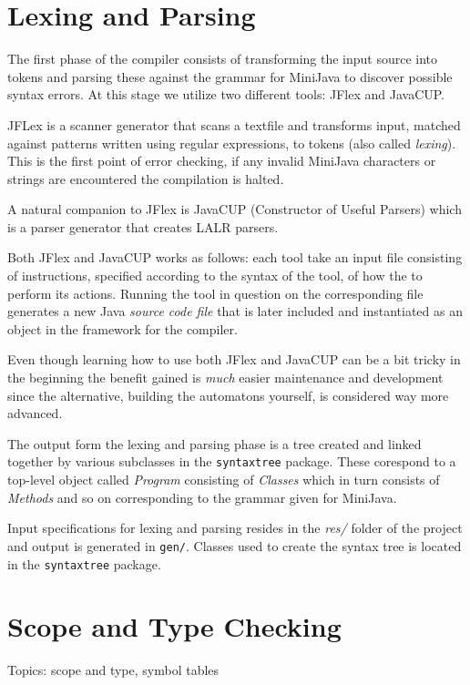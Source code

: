 \documentclass[11pt]{amsart}
\begin{document}
\section{Lexing and Parsing}
The first phase of the compiler consists of transforming the input source into tokens and parsing these against the grammar for MiniJava to discover possible syntax errors. At this stage we utilize two different tools: JFlex and JavaCUP. 

JFLex is a scanner generator that scans a textfile and transforms input, matched against patterns written using regular expressions, to tokens (also called \textit{lexing}). This is the first point of error checking, if any invalid MiniJava characters or strings are encountered the compilation is halted.

A natural companion to JFlex is JavaCUP (Constructor of Useful Parsers) which is a parser generator that creates LALR parsers\cite{appel}.

Both JFlex and JavaCUP works as follows: each tool take an input file consisting of instructions, specified according to the syntax of the tool, of how the to perform its actions. Running the tool in question on the corresponding file generates a new Java \textit{source code file} that is later included and instantiated as an object in the framework for the compiler. 

Even though learning how to use both JFlex and JavaCUP can be a bit tricky in the beginning the benefit gained is \textit{much} easier maintenance and development since the alternative, building the automatons\cite{automata} yourself, is considered way more advanced.

The output form the lexing and parsing phase is a tree created and linked together by various subclasses in the \texttt{syntaxtree} package. These corespond to a top-level object called \textit{Program} consisting of \textit{Classes} which in turn consists of \textit{Methods} and so on corresponding to the grammar given for MiniJava\cite{grammar}.

Input specifications for lexing and parsing resides in the \textit{res/} folder of the project and output is generated in \texttt{gen/}. Classes used to create the syntax tree is located in the \texttt{syntaxtree} package.

\section{Scope and Type Checking}
Topics: scope and type, symbol tables
\end{document}
